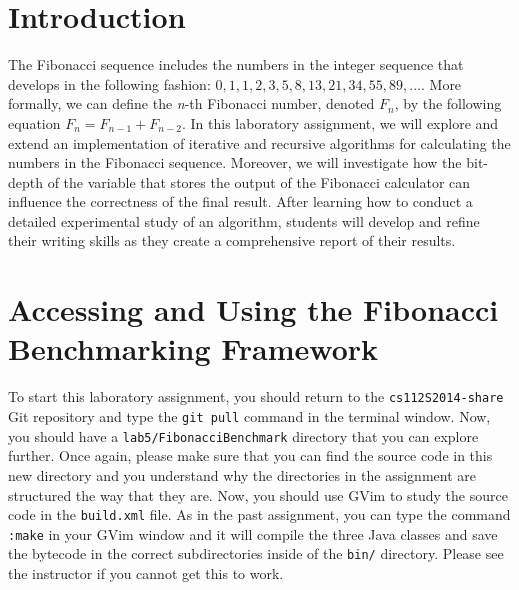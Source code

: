 


\usepackage[compact]{titlesec}


\section*{Introduction}

The Fibonacci sequence includes the numbers in the integer sequence that develops in the following fashion: $0, 1, 1,
2, 3, 5, 8, 13, 21, 34, 55, 89, \ldots$. More formally, we can define the {\em n}-th Fibonacci number, denoted $F_n$,
by the following equation $F_n = F_{n-1} + F_{n-2}$. In this laboratory assignment, we will explore and
extend an implementation of iterative and recursive algorithms for calculating the numbers in the Fibonacci sequence.
Moreover, we will investigate how the bit-depth of the variable that stores the output of the Fibonacci calculator can
influence the correctness of the final result. After learning how to conduct a detailed experimental study of an
algorithm, students will develop and refine their writing skills as they create a comprehensive report of their results.

\section*{Accessing and Using the Fibonacci Benchmarking Framework}

\begin{sloppypar} To start this laboratory assignment, you should return to the {\tt cs112S2014-share} Git repository
  and type the {\tt git pull} command in the terminal window.  Now, you should have a {\tt lab5/FibonacciBenchmark}
  directory that you can explore further.  Once again, please make sure that you can find the source code in this new
  directory and you understand why the directories in the assignment are structured the way that they are. Now, you
  should use GVim to study the source code in the {\tt build.xml} file.  As in the past assignment, you can type the
  command {\tt :make} in your GVim window and it will compile the three Java classes and save the bytecode in the
  correct subdirectories inside of the {\tt bin/} directory.  Please see the instructor if you cannot get this to work.
\end{sloppypar}

